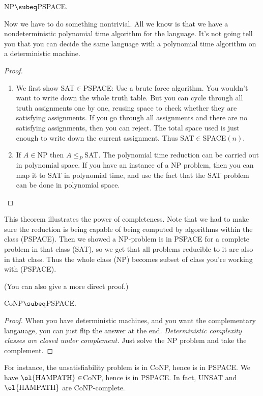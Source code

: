\begin{thm}
NP$\subeq$PSPACE.
\end{thm}
Now we have to do something nontrivial. All we know is that we have a nondeterministic polynomial time algorithm for the language. It's not going tell you that you can decide the same language with a polynomial time algorithm on a deterministic machine.
\begin{proof}
\begin{enumerate}
\item
We first show SAT$\in$PSPACE: Use a brute force algorithm. You wouldn't want to write down the whole truth table. But you can cycle through all truth assignments one by one, reusing space to check whether they are satisfying assignments. If you go through all assignments and there are no satisfying assignments, then you can reject. The total space used is just enough to write down the  current assignment. Thus SAT$\in$SPACE$(n)$.
\item
If $A\in $NP then $A\le_P$SAT. The polynomial time reduction can be carried out in polynomial space. 
If you have an instance of a NP problem, then you can map it to SAT in polynomial time, and use the fact that the SAT problem can be done in polynomial space.
\end{enumerate}
\end{proof}
This theorem illustrates the power of completeness. Note that we had to make sure the reduction is being capable of being computed by algorithms within the class (PSPACE). Then we showed a NP-problem is in PSPACE for a complete problem in that class (SAT), so we get that all problems reducible to it are also in that class. Thus the whole class (NP) becomes subset of class you're working with (PSPACE).

(You can also give a more direct proof.)
\begin{thm}
CoNP$\subeq$PSPACE.
\end{thm}
\begin{proof}
When you have deterministic machines, and you want the complementary langauage, you can just flip the answer at the end. {\it Deterministic complexity classes are closed under complement.}
Just solve the NP problem and take the complement.
\end{proof}
For instance, the unsatisfiability problem is in CoNP, hence is in PSPACE. We have $\ol{\text{HAMPATH}}\in$CoNP, hence is in PSPACE.  
In fact, UNSAT and $\ol{\text{HAMPATH}}$ are CoNP-complete.

